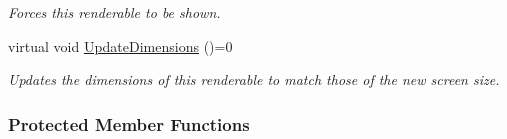 \begin{DoxyCompactItemize}
\begin{DoxyCompactList}\small\item\em Forces this renderable to be shown. \item\end{DoxyCompactList}\item 
virtual void \hyperlink{classMezzanine_1_1UI_1_1BasicRenderable_a446b43c6dde21c7f0c021ca6833f841d}{UpdateDimensions} ()=0
\begin{DoxyCompactList}\small\item\em Updates the dimensions of this renderable to match those of the new screen size. \item\end{DoxyCompactList}\end{DoxyCompactItemize}
\subsubsection*{Protected Member Functions}
